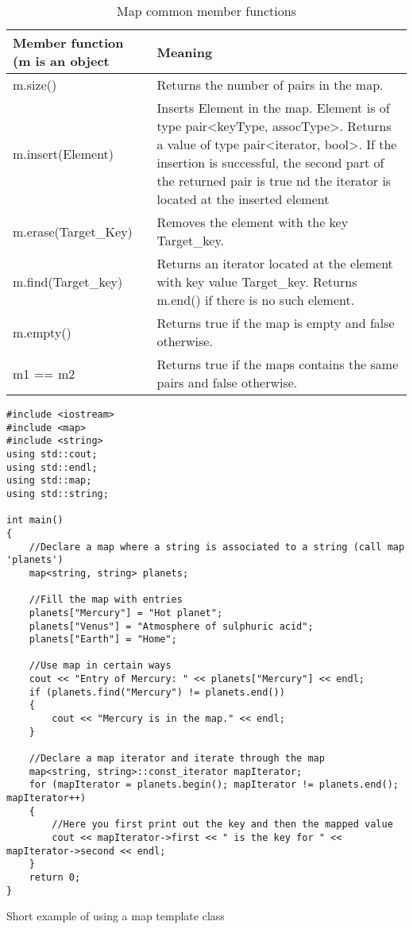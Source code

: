 \begin{table}[H]
\begin{center}
\renewcommand{\arraystretch}{1.8}
\begin{tabular}{ m{4.5cm} m{11cm}} 
\textbf{Member function (m is an object} & \textbf{Meaning}\\
\hline

m.size() & Returns the number of pairs in the map.\\
\hline

m.insert(Element) & Inserts Element in the map. Element is of type
pair\textless keyType, assocType\textgreater. Returns a value of type
pair\textless iterator, bool\textgreater. If the insertion is successful, the second part of the
returned pair is true nd the iterator is located at the inserted element\\
\hline

m.erase(Target\_Key) & Removes the element with the key Target\_key.\\
\hline

m.find(Target\_key) & Returns an iterator located at the element with key value Target\_key.
Returns m.end() if there is no such element.\\
\hline

m.empty() & Returns true if the map is empty and false otherwise.\\
\hline

m1 == m2 & Returns true if the maps contains the same pairs and false otherwise.\\
\hline
\end{tabular}
\end{center}
\caption{Map common member functions}
\label{table_1}
\end{table}


\begin{listing}[H]
\begin{verbatim}
#include <iostream>
#include <map>
#include <string>
using std::cout;
using std::endl;
using std::map;
using std::string;

int main()
{
	//Declare a map where a string is associated to a string (call map 'planets')
	map<string, string> planets;
	
	//Fill the map with entries
	planets["Mercury"] = "Hot planet";
	planets["Venus"] = "Atmosphere of sulphuric acid";
	planets["Earth"] = "Home";
	
	//Use map in certain ways
	cout << "Entry of Mercury: " << planets["Mercury"] << endl;
	if (planets.find("Mercury") != planets.end())
	{
		cout << "Mercury is in the map." << endl;
	}
	
	//Declare a map iterator and iterate through the map
	map<string, string>::const_iterator mapIterator;
	for (mapIterator = planets.begin(); mapIterator != planets.end(); mapIterator++)
	{
		//Here you first print out the key and then the mapped value
		cout << mapIterator->first << " is the key for " << mapIterator->second << endl;
	}
	return 0;
}
\end{verbatim}
\caption{Short example of using a map template class}
\label{source_code_1}
\end{listing}

